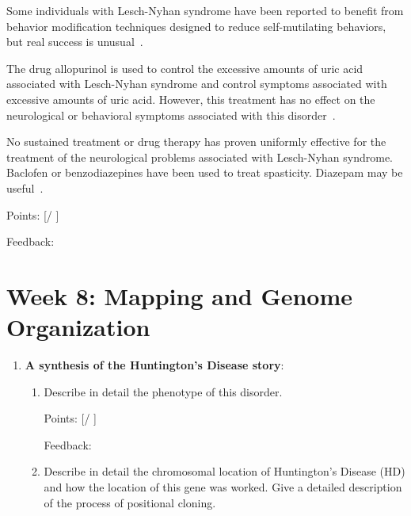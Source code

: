 \documentclass[plain,basic]{inVerba-notes}
\begin{document}
{\begin{enumerate}
\begin{enumerate}
{      Some individuals with Lesch-Nyhan syndrome have been reported to benefit from behavior modification techniques designed to reduce self-mutilating behaviors, but real success is unusual~\cite{nord2}.

      The drug allopurinol is used to control the excessive amounts of uric acid associated with Lesch-Nyhan syndrome and control symptoms associated with excessive amounts of uric acid. However, this treatment has no effect on the neurological or behavioral symptoms associated with this disorder~\cite{nord2}.

      No sustained treatment or drug therapy has proven uniformly effective for the treatment of the neurological problems associated with Lesch-Nyhan syndrome. Baclofen or benzodiazepines have been used to treat spasticity. Diazepam may be useful~\cite{nord2}.
    }

    Points: [\qquad / \qquad ]

    Feedback: 

    \vspace*{50pt}
  \end{enumerate}

\end{enumerate}
  
\newpage
\section{Week 8: Mapping and Genome Organization}
\begin{enumerate}
  \item \textbf{A synthesis of the Huntington’s Disease story}:
  
  \begin{enumerate}
    \item  Describe in detail the phenotype of this disorder.
    

    Points: [\qquad / \qquad ]

    Feedback: 

    \vspace*{50pt}
    \item Describe in detail the chromosomal location of Huntington’s Disease (HD) and how the location of this gene was worked. Give a detailed description of the process of positional cloning.
    

\end{enumerate}
\end{enumerate}}
\end{document}

